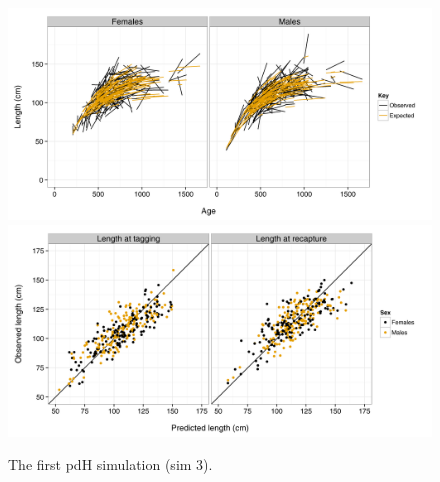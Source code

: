 \documentclass[11pt, a4paper]{article}
\begin{document}
\begin{figure}[!htbp]
  \centering
  \includegraphics[width=\linewidth]{../simulation/sims2/results/IndivGrowth_3.png}
  \includegraphics[width=\linewidth]{../simulation/sims2/results/ObsVsPred_3.png}
  \begin{quote}
    \caption{The first pdH simulation (sim 3).}
    \label{fig:sims2-fits}
  \end{quote}
\end{figure}




%
%

\end{document}
